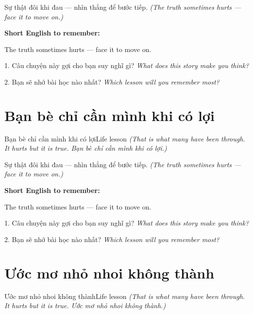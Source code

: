 \begin{baihoc}
Sự thật đôi khi đau — nhìn thẳng để bước tiếp.
\textit{(The truth sometimes hurts — face it to move on.)}
\end{baihoc}

\begin{ghinhoanh}
\textbf{Short English to remember:}

The truth sometimes hurts — face it to move on.

\end{ghinhoanh}

\begin{tuhocnhanh}
1. Câu chuyện này gợi cho bạn suy nghĩ gì? \textit{What does this story make you think?}

2. Bạn sẽ nhớ bài học nào nhất? \textit{Which lesson will you remember most?}
\end{tuhocnhanh}
\ngancach


\section{Bạn bè chỉ cần mình khi có lợi}
\begin{truyen}{Bạn bè chỉ cần mình khi có lợi}{Life lesson}
\textit{(That is what many have been through. It hurts but it is true. Bạn bè chỉ cần mình khi có lợi.)}
\end{truyen}

\begin{baihoc}
Sự thật đôi khi đau — nhìn thẳng để bước tiếp.
\textit{(The truth sometimes hurts — face it to move on.)}
\end{baihoc}

\begin{ghinhoanh}
\textbf{Short English to remember:}

The truth sometimes hurts — face it to move on.

\end{ghinhoanh}

\begin{tuhocnhanh}
1. Câu chuyện này gợi cho bạn suy nghĩ gì? \textit{What does this story make you think?}

2. Bạn sẽ nhớ bài học nào nhất? \textit{Which lesson will you remember most?}
\end{tuhocnhanh}
\ngancach


\section{Ước mơ nhỏ nhoi không thành}
\begin{truyen}{Ước mơ nhỏ nhoi không thành}{Life lesson}
\textit{(That is what many have been through. It hurts but it is true. Ước mơ nhỏ nhoi không thành.)}
\end{truyen}

